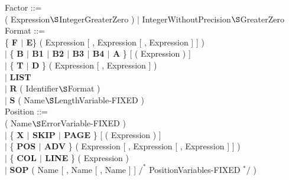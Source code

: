 Factor ::=\\
\x ( Expression$\S $IntegerGreaterZero ) $\mid$ IntegerWithoutPrecision$\S $GreaterZero\\

Format ::=\\
\x \{ {\bf F $\mid$ E}\} ( Expression [ , Expression [ , Expression ] ] ) \\
\x $\mid$ \{ {\bf B $\mid$ B1 $\mid$ B2 $\mid$ B3 $\mid$ B4 $\mid$ A} \} [ ( Expression ) ]\\
\x $\mid$ \{ {\bf T $\mid$ D} \} ( Expression [ , Expression ] )\\
\x $\mid$ {\bf LIST}\\
\x $\mid$ {\bf R} ( Identifier$\S $Format )\\
\x $\mid$ {\bf S} ( Name$\S $LengthVariable-FIXED )\\

Position ::=\\
 ( Name$\S $ErrorVariable-FIXED )\\
\x $\mid$ \{ {\bf X $\mid$ SKIP $\mid$ PAGE} \} [ ( Expression ) ]\\
\x $\mid$ \{ {\bf POS $\mid$ ADV} \} ( Expression [ , Expression [ , Expression ] ] )\\
\x $\mid$ \{ {\bf COL $\mid$ LINE} \} ( Expression )\\
\x $\mid$ {\bf SOP} ( Name [ , Name [ , Name ] ]  $/^*$ PositionVariables-FIXED $^*/$ )\\


